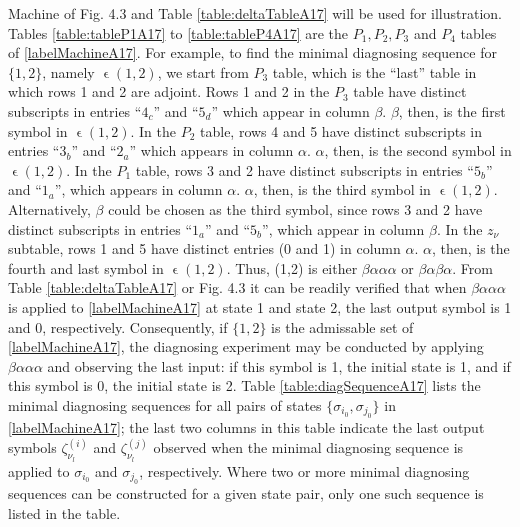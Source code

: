     \setcounter{machineNumber}{16}
    \incSampleMachine
    Machine \sampleMachine \label{labelMachineA17} of Fig. 4.3 and Table \ref{table:deltaTableA17} will be used for illustration. Tables \ref{table:tableP1A17} to \ref{table:tableP4A17} are the $P_1, P_2, P_3$ and $P_4$ tables of \ref{labelMachineA17}. For example, to find the minimal diagnosing sequence for $\{1,2\}$, namely $ \upvarepsilon( 1, 2 )$, we start from $P_3$ table, which is the ``last'' table in which rows 1 and 2 are adjoint. Rows 1 and 2 in the $P_3$ table have distinct subscripts in entries ``$4_c$'' and ``$5_d$'' which appear in column $\beta$. $\beta$, then, is the first symbol in $\upvarepsilon(1,2)$. In the $P_2$ table, rows 4 and 5 have distinct subscripts in entries ``$3_b$'' and ``$2_a$'' which appears in column $\alpha$. $\alpha$, then, is the second symbol in $\upvarepsilon(1,2)$. In the $P_1$ table, rows 3 and 2 have distinct subscripts in entries ``$5_b$'' and ``$1_a$'', which appears in column $\alpha$. $\alpha$, then, is the third symbol in $\upvarepsilon(1,2)$. Alternatively, $\beta$ could be chosen as the third symbol, since rows 3 and 2 have distinct subscripts in entries ``$1_a$'' and ``$5_b$'',  which appear in column $\beta$. In the $z_\nu$ subtable, rows 1 and 5 have distinct entries (0 and 1) in column $\alpha$. $\alpha$, then, is the fourth and last symbol in $\upvarepsilon(1,2)$. Thus, (1,2) is either $\beta\alpha\alpha\alpha$ or $\beta\alpha\beta\alpha$. From Table \ref{table:deltaTableA17} or Fig. 4.3 it can be readily verified that when $\beta\alpha\alpha\alpha$ is applied to \ref{labelMachineA17} at state 1 and state 2, the last output symbol is 1 and 0, respectively. Consequently, if $\{1,2\}$ is the admissable set of \ref{labelMachineA17}, the diagnosing experiment may be conducted by applying $\beta\alpha\alpha\alpha$ and observing the last input: if this symbol is 1, the initial state is 1, and if this symbol is 0, the initial state is 2. Table \ref{table:diagSequenceA17} lists the minimal diagnosing sequences for all pairs of states $ \{  \sigma_{i_{0}}, \sigma_{j_{0}} \} $ in \ref{labelMachineA17}; the last two columns in this table indicate the last output symbols $\zeta^{(i)}_{\nu_{l}}$ and $\zeta^{(j)}_{\nu_{l}}$ observed when the minimal diagnosing sequence is applied to $\sigma_{i_{0}}$ and $\sigma_{j_{0}}$, respectively. Where two or more minimal diagnosing sequences can be constructed for a given state pair, only one such sequence is listed in the table.

